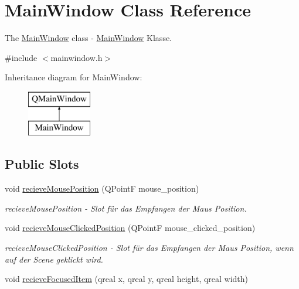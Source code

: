 \hypertarget{class_main_window}{}\section{Main\+Window Class Reference}
\label{class_main_window}


The \hyperlink{class_main_window}{Main\+Window} class -\/ \hyperlink{class_main_window}{Main\+Window} Klasse.  




{\ttfamily \#include $<$mainwindow.\+h$>$}

Inheritance diagram for Main\+Window\+:\begin{figure}[H]
\begin{center}
\leavevmode
\includegraphics[height=2.000000cm]{class_main_window}
\end{center}
\end{figure}
\subsection*{Public Slots}
\begin{DoxyCompactItemize}
\item 
void \hyperlink{class_main_window_a965877b0ba4c3f18035232a9eb7b98e0}{recieve\+Mouse\+Position} (Q\+PointF mouse\+\_\+position)
\begin{DoxyCompactList}\small\item\em recieve\+Mouse\+Position -\/ Slot für das Empfangen der Maus Position. \end{DoxyCompactList}\item 
void \hyperlink{class_main_window_a3ea2675e6bd470873d7569db47a5bd2a}{recieve\+Mouse\+Clicked\+Position} (Q\+PointF mouse\+\_\+clicked\+\_\+position)
\begin{DoxyCompactList}\small\item\em recieve\+Mouse\+Clicked\+Position -\/ Slot für das Empfangen der Maus Position, wenn auf der Scene geklickt wird. \end{DoxyCompactList}\item 
void \hyperlink{class_main_window_aee13312aef8f1fc2a4c7ff2f8837234c}{recieve\+Focused\+Item} (qreal x, qreal y, qreal height, qreal width)
\end{DoxyCompactItemize}
